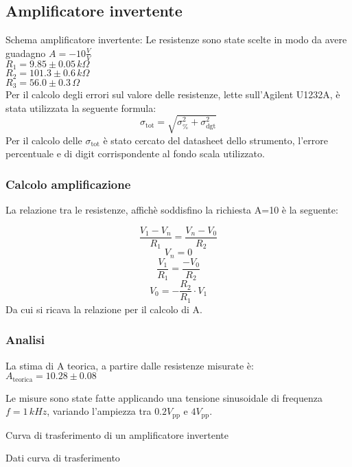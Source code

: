 \subsection{Amplificatore invertente}
Schema amplificatore invertente:
Le resistenze sono state scelte in modo da avere guadagno $A=-10 \frac{V}{V}$\\
$R_1=9.85 \pm 0.05\,k\Omega $\\ %
$R_2=101.3 \pm 0.6\,k\Omega$\\ %
$R_3=56.0 \pm 0.3\,\Omega$\\ %

Per il calcolo degli errori sul valore delle resistenze, lette sull'Agilent U1232A, è stata utilizzata la seguente formula:
$$\sigma_\textrm{tot}=\sqrt{ \sigma^{2} _\textrm{\%} + \sigma^{2} _\textrm{dgt}}$$
Per il calcolo delle $\sigma_\textrm{tot}$ è stato cercato del datasheet dello strumento, l'errore percentuale e di digit
corrispondente al fondo scala utilizzato.

\subsubsection{Calcolo amplificazione}
La relazione tra le resistenze, affichè soddisfino la richiesta A=10 è la seguente:

$$\frac{V_1-V_n}{R_1}=\frac{V_n-V_0}{R_2}$$
$$V_n=0$$
$$\frac{V_1}{R_1}=\frac{-V_0}{R_2}$$
$$V_0=-\frac{R_2}{R_1} \cdot V_1$$
Da cui si ricava la relazione per il calcolo di A.

\subsubsection{Analisi}
La stima di A teorica, a partire dalle resistenze misurate è:\\
$A_\textrm{teorica}=10.28 \pm 0.08$ %

Le misure sono state fatte applicando una tensione sinusoidale di frequenza $ f=1 \,kHz$, variando l'ampiezza tra 
$0.2 V_\textrm{pp}$ e $4 V_\textrm{pp}$.

\begin{grafico}
 \centering
 \resizebox{\textwidth}{!}{%
 
 }%
 \caption{Curva di trasferimento di un amplificatore invertente} 
 \label{gr:amp_inv.tex} 
\end{grafico}

\begin{tabella}
 \centering
  
 \caption{Dati curva di trasferimento}
 \label{tab:tab_inv.tex}
\end{tabella}

